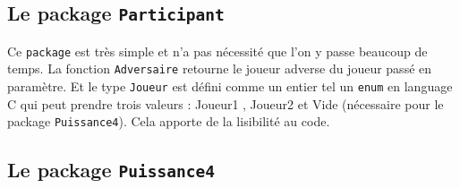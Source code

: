 \documentclass[a4paper,11pt]{article}
\begin{document}
\subsection{Le package {\tt Participant}}

Ce {\tt package} est très simple et n'a pas nécessité que l'on y passe beaucoup
de temps. La fonction {\tt Adversaire} retourne le joueur adverse du joueur
passé en paramètre. Et le type {\tt Joueur} est défini comme un entier
tel un {\tt enum} en language C qui peut prendre trois valeurs : Joueur1
, Joueur2 et Vide (nécessaire pour le package {\tt Puissance4}).
Cela apporte de la lisibilité au code.

\subsection{Le package {\tt Puissance4}}
\end{document}
